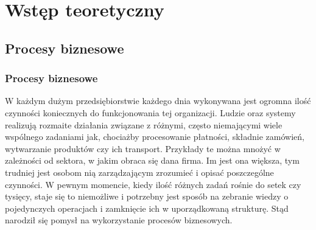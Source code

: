 \chapter{Wstęp teoretyczny}
\label{cha:wstepTeoretyczny}


\section{Procesy biznesowe}
\label{sec:procesyBiznesowe}

\subsection{Procesy biznesowe}
W każdym dużym przedsiębiorstwie każdego dnia wykonywana jest ogromna ilość czynności koniecznych do funkcjonowania tej organizacji. Ludzie oraz systemy realizują rozmaite działania związane z różnymi, często niemającymi wiele wspólnego zadaniami jak, chociażby procesowanie płatności, składnie zamówień, wytwarzanie produktów czy ich transport. Przykłady te można mnożyć w zależności od sektora, w jakim obraca się dana firma. Im jest ona większa, tym trudniej jest osobom nią zarządzającym zrozumieć i opisać poszczególne czynności. W pewnym momencie, kiedy ilość różnych zadań rośnie do setek czy tysięcy, staje się to niemożliwe i potrzebny jest sposób na zebranie wiedzy o pojedynczych operacjach i zamknięcie ich w uporządkowaną strukturę. Stąd narodził się pomysł na wykorzystanie procesów biznesowych.

